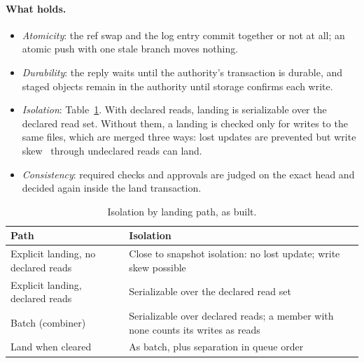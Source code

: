 \documentclass[11pt]{article}
\begin{document}
\paragraph{What holds.}
\begin{itemize}
\item \emph{Atomicity}: the ref swap and the log entry commit together or not at all; an
  atomic push with one stale branch moves nothing.
\item \emph{Durability}: the reply waits until the authority's transaction is durable,
  and staged objects remain in the authority until storage confirms each write.
\item \emph{Isolation}: Table~\ref{tab:isolation}. With declared reads, landing is
  serializable over the declared read set. Without them, a landing is checked only for
  writes to the same files, which are merged three ways: lost updates are prevented but
  write skew~\cite{berenson1995critique} through undeclared reads can land.
\item \emph{Consistency}: required checks and approvals are judged on the exact head and
  decided again inside the land transaction.
\end{itemize}

\begin{table}[t]
\centering
\small
\begin{tabularx}{\linewidth}{@{}lX@{}}
\toprule
Path & Isolation \\
\midrule
Explicit landing, no declared reads & Close to snapshot isolation: no lost update; write skew possible \\
Explicit landing, declared reads & Serializable over the declared read set \\
Batch (combiner) & Serializable over declared reads; a member with none counts its writes as reads \\
Land when cleared & As batch, plus separation in queue order \\
\bottomrule
\end{tabularx}
\caption{Isolation by landing path, as built.}
\label{tab:isolation}
\end{table}
\end{document}
